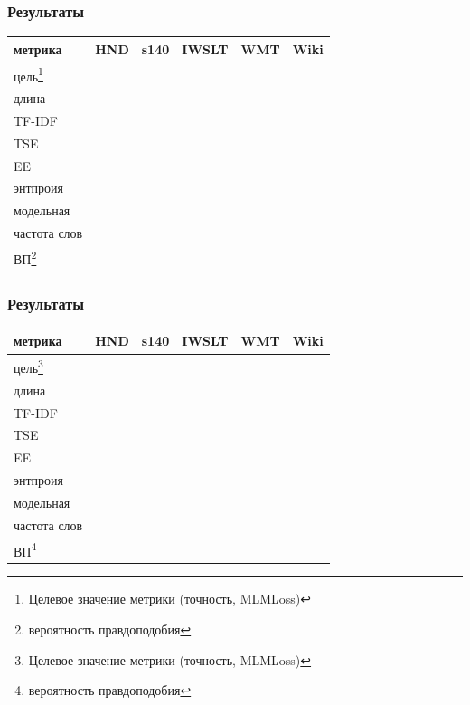 \documentclass{beamer}
\begin{document}
\begin{frame}
	\frametitle{Результаты}
	\begin{table}
		\begin{tabular}{l|cc|cc|c}
			метрика & HND & s140 & IWSLT & WMT & Wiki \\
			\hline
			цель\footnote[1]{Целевое значение метрики (точность, MLMLoss)} &&&&&\\
			\hline
			длина &&&&& \\
			TF-IDF &&&&& \\
			TSE &&&&& \\
			EE &&&&& \\
			энтпроия &&&&& \\
			модельная &&&&& \\
			частота слов &&&&& \\
			ВП\footnote[2]{вероятность правдоподобия} &&&&& \\
			\hline
		\end{tabular}
	\end{table}
\end{frame}

\begin{frame}
	\frametitle{Результаты}
	\begin{table}
		\begin{tabular}{l|cc|cc|c}
			метрика & HND & s140 & IWSLT & WMT & Wiki \\
			\hline
			цель\footnote[1]{Целевое значение метрики (точность, MLMLoss)} &&&&&\\
			\hline
			длина &&&&& \\
			TF-IDF &&&&& \\
			TSE &&&&& \\
			EE &&&&& \\
			энтпроия &&&&& \\
			модельная &&&&& \\
			частота слов &&&&& \\
			ВП\footnote[2]{вероятность правдоподобия} &&&&& \\
			\hline
		\end{tabular}
	\end{table}
\end{frame}
\end{document}
